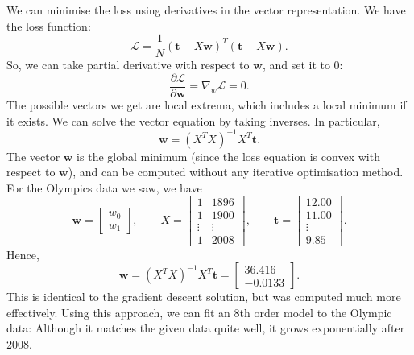 \documentclass[a4paper, openany]{memoir}
\begin{document}
    We can minimise the loss using derivatives in the vector representation. We have the loss function:
    \[\mathcal{L} = \frac{1}{N} (\mathbf{t} - X \mathbf{w})^T (\mathbf{t} - X \mathbf{w}).\]
    So, we can take partial derivative with respect to $\mathbf{w}$, and set it to 0:
    \[\frac{\partial \mathcal{L}}{\partial \mathbf{w}} = \nabla_w \mathcal{L} = 0.\]
    The possible vectors we get are local extrema, which includes a local minimum if it exists. We can solve the vector equation by taking inverses. In particular,
    \[\mathbf{w} = (X^T X)^{-1}X^T \mathbf{t}.\]
    The vector $\mathbf{w}$ is the global minimum (since the loss equation is convex with respect to $\mathbf{w}$), and can be computed without any iterative optimisation method. For the Olympics data we saw, we have
    \[\mathbf{w} = \begin{bmatrix}
        w_0 \\
        w_1
    \end{bmatrix}, \qquad X = \begin{bmatrix}
        1 & 1896 \\
        1 & 1900 \\
        \vdots & \vdots \\
        1 & 2008
    \end{bmatrix}, \qquad \mathbf{t} = \begin{bmatrix}
        12.00 \\
        11.00 \\
        \vdots \\
        9.85
    \end{bmatrix}.\]
    Hence,
    \[\mathbf{w} = (X^TX)^{-1}X^T \mathbf{t} = \begin{bmatrix}
        36.416 \\
        -0.0133
    \end{bmatrix}.\]
    This is identical to the gradient descent solution, but was computed much more effectively. Using this approach, we can fit an 8th order model to the Olympic data:
    Although it matches the given data quite well, it grows exponentially after 2008.
\end{document}
